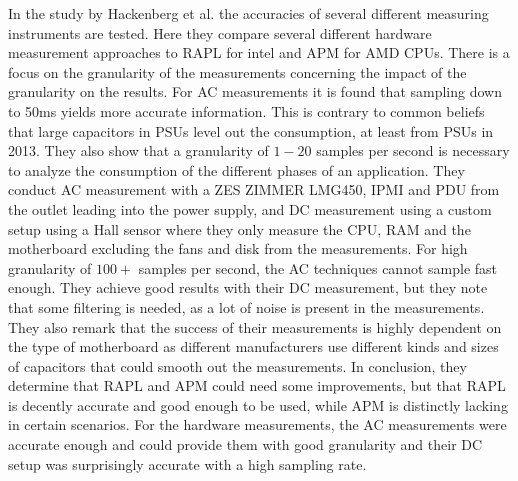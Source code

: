 In the study by Hackenberg et al.\cite{hackenberg2013} the accuracies of several different measuring instruments are tested. Here they compare several different hardware measurement approaches to RAPL for intel and APM for AMD CPUs. There is a focus on the granularity of the measurements concerning the impact of the granularity on the results. For AC measurements it is found that sampling down to 50ms yields more accurate information. This is contrary to common beliefs that large capacitors in PSUs level out the consumption, at least from PSUs in 2013. They also show that a granularity of $1-20$ samples per second is necessary to analyze the consumption of the different phases of an application. They conduct AC measurement with a ZES ZIMMER LMG450, IPMI and PDU from the outlet leading into the power supply, and DC measurement using a custom setup using a Hall sensor where they only measure the CPU, RAM and the motherboard excluding the fans and disk from the measurements. For high granularity of $100+$ samples per second, the AC techniques cannot sample fast enough. They achieve good results with their DC measurement, but they note that some filtering is needed, as a lot of noise is present in the measurements. They also remark that the success of their measurements is highly dependent on the type of motherboard as different manufacturers use different kinds and sizes of capacitors that could smooth out the measurements. In conclusion, they determine that RAPL and APM could need some improvements, but that RAPL is decently accurate and good enough to be used, while APM is distinctly lacking in certain scenarios. For the hardware measurements, the AC measurements were accurate enough and could provide them with good granularity and their DC setup was surprisingly accurate with a high sampling rate.\cite{hackenberg2013}\newline
